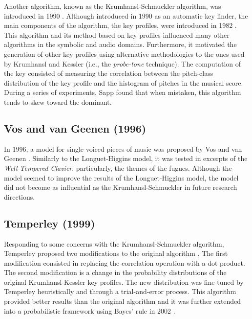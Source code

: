Another algorithm, known as the Krumhansl-Schmuckler algorithm, was introduced in 1990 \cite{krumhansl_cognitive_1990}. Although introduced in 1990 as an automatic key finder, the main components of the algorithm, the key profiles, were introduced in 1982 \cite{krumhansl_tracing_1982}. This algorithm and its method based on key profiles influenced many other algorithms in the symbolic and audio domains. Furthermore, it motivated the generation of other key profiles using alternative methodologies to the ones used by Krumhansl and Kessler (i.e., the \emph{probe-tone} technique). The computation of the key consisted of measuring the correlation between the pitch-class distribution of the key profile and the histogram of pitches in the musical score. During a series of experiments, Sapp \cite{sapp_computational_2011} found that when mistaken, this algorithm tends to skew toward the dominant.

\subsection{Vos and van Geenen (1996)}


In 1996, a model for single-voiced pieces of music was proposed by Vos and van Geenen \cite{vos_parallel-processing_1996}. Similarly to the Longuet-Higgins model, it was tested in excerpts of the \emph{Well-Tempered Clavier}, particularly, the themes of the fugues. Although the model seemed to improve the results of the Longuet-Higgins model, the model did not become as influential as the Krumhansl-Schmuckler in future research directions.


\subsection{Temperley (1999)}

Responding to some concerns with the Krumhansl-Schmuckler algorithm, Temperley proposed two modifications to the original algorithm \cite{temperley_whats_1999}. The first modification consisted in replacing the correlation operation with a dot product. The second modification is a change in the probability distributions of the original Krumhansl-Kessler key profiles. The new distribution was fine-tuned by Temperley heuristically and through a trial-and-error process. This algorithm provided better results than the original algorithm and it was further extended into a probabilistic framework using Bayes' rule in 2002 \cite{temperley_bayesian_2002}.

